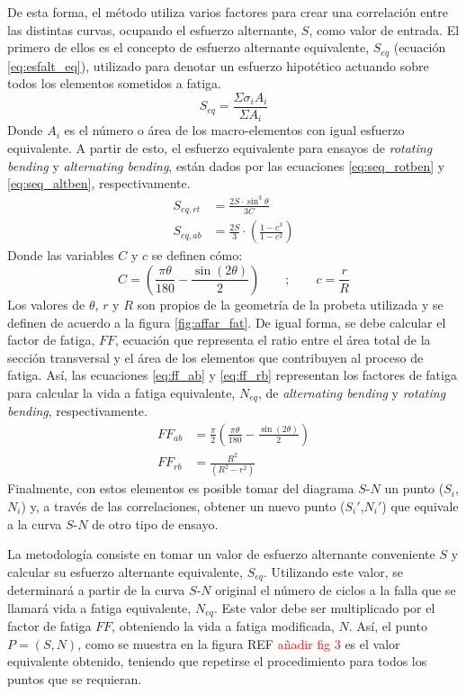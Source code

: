 De esta forma, el método utiliza varios factores para crear una correlación entre las distintas curvas, ocupando el esfuerzo alternante, $S$, como valor de entrada. El primero de ellos es el concepto de esfuerzo alternante equivalente, $S_{eq}$ (ecuación \ref{eq:esfalt_eq}), utilizado para denotar un esfuerzo hipotético actuando sobre todos los elementos sometidos a fatiga. 
\begin{equation}\label{eq:esfalt_eq}
	S_{eq} = \frac{\Sigma \sigma_i A_i}{\Sigma A_i}
\end{equation}
Donde $A_i$ es el número o área de los macro-elementos con igual esfuerzo equivalente. A partir de esto, el esfuerzo equivalente para ensayos de \textit{rotating bending} y \textit{alternating bending}, están dados por las ecuaciones \ref{eq:seq_rotben} y \ref{eq:seq_altben}, respectivamente. 
\begin{align}
	S_{eq,rt} &= \frac{2S\cdot \sin^3 \theta}{3C} \label{eq:seq_rotben}\\
	S_{eq,ab} &= \frac{2S}{3} \cdot \left(\frac{1-c^3}{1-c^2}\right) \label{eq:seq_altben}
\end{align}
Donde las variables $C$ y $c$ se definen cómo:
\begin{equation}
	C= \left(\frac{\pi\theta}{180} - \frac{\sin(2\theta)}{2}\right)\qquad ;\qquad c=\frac{r}{R}
\end{equation}
Los valores de $\theta$, $r$ y $R$ son propios de la geometría de la probeta utilizada y se definen de acuerdo a la figura \ref{fig:affar_fat}. De igual forma, se debe calcular el factor de fatiga, $FF$, ecuación que representa el ratio entre el área total de la sección transversal y el área de los elementos que contribuyen al proceso de fatiga. Así, las ecuaciones \ref{eq:ff_ab} y \ref{eq:ff_rb} representan los factores de fatiga para calcular la vida a fatiga equivalente, $N_{eq}$, de \textit{alternating bending} y \textit{rotating bending}, respectivamente.
\begin{align}
	FF_{ab} &= \frac{\pi}{2} \left(\frac{\pi\theta}{180} - \frac{\sin(2\theta)}{2}\right) \label{eq:ff_ab}\\		
	FF_{rb} &= \frac{R^2}{(R^2 - r^2)} \label{eq:ff_rb}
\end{align}
Finalmente, con estos elementos es posible tomar del diagrama $S$-$N$ un punto ($S_i$,$N_i$) y, a través de las correlaciones, obtener un nuevo punto ($S_i'$,$N_i'$) que equivale a la curva $S$-$N$ de otro tipo de ensayo.

La metodología consiste en tomar un valor de esfuerzo alternante conveniente $S$ y calcular su esfuerzo alternante equivalente, $S_{eq}$. Utilizando este valor, se determinará a partir de la curva $S$-$N$ original el número de ciclos a la falla que se llamará vida a fatiga equivalente, $N_{eq}$. Este valor debe ser multiplicado por el factor de fatiga $FF$, obteniendo la vida a fatiga modificada, $N$. Así, el punto $P=(S,N)$, como se muestra en la figura REF \textcolor{red}{añadir fig 3} es el valor equivalente obtenido, teniendo que repetirse el procedimiento para todos los puntos que se requieran.


